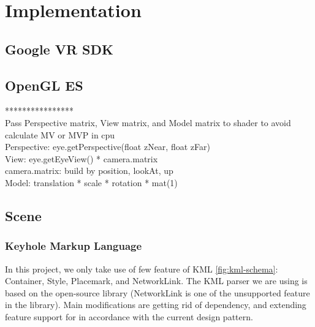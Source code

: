 \label{chapter-implementation}
\chapter{Implementation}

\section{Google VR SDK}

\section{OpenGL ES}

****************\\
Pass Perspective matrix, View matrix, and Model matrix to shader to avoid calculate MV or MVP in cpu\\
Perspective: eye.getPerspective(float zNear, float zFar)\\
View: eye.getEyeView() * camera.matrix\\
camera.matrix: build by position, lookAt, up\\
Model: translation * scale * rotation * mat(1)\\

\section{Scene}

\subsection{Keyhole Markup Language}

In this project, we only take use of few feature of KML \ref{fig:kml-schema}: Container, Style, Placemark,  and NetworkLink. The KML parser we are using is based on the open-source library  \parencite{Google.code-kml.2016} (NetworkLink is one of the unsupported feature in the library). Main modifications are getting rid of  dependency, and extending feature support for  in accordance with the current design pattern.



